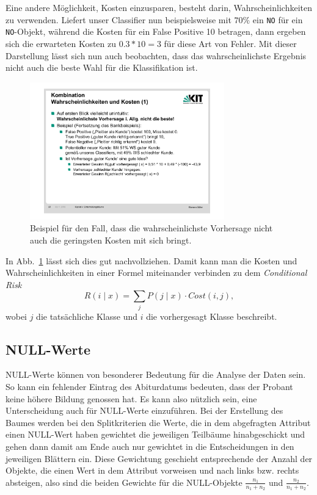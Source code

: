 Eine andere Möglichkeit, Kosten einzusparen, besteht darin, Wahrscheinlichkeiten
zu verwenden. Liefert unser Classifier nun beispielsweise mit \(70\%\) ein
\texttt{NO} für ein \texttt{NO}-Objekt, während die Kosten für ein False Positive 10 betragen,
dann ergeben sich die erwarteten Kosten zu \(0.3 * 10 = 3\) für diese Art von
Fehler. Mit dieser Darstellung
lässt sich nun auch beobachten, dass das wahrscheinlichste Ergebnis nicht auch
die beste Wahl für die Klassifikation ist.

\begin{figure}[ht]
	\centering
	\includegraphics[width=0.75\textwidth]{Figures/classifier}
	\caption[Beispiel Classifier]{Beispiel für  den Fall, dass
	die wahrscheinlichste Vorhersage nicht auch die geringsten Kosten
	mit sich bringt.\footnotemark}
	\label{fig:classifier_ex}
\end{figure}

In Abb.~\ref{fig:classifier_ex} lässt sich dies gut nachvollziehen. Damit kann
man die Kosten und Wahrscheinlichkeiten in einer Formel miteinander verbinden
zu dem \textit{Conditional Risk}
\[
	R(i \mid x) = \sum_j P(j \mid x) \cdot Cost(i,j),
\]
wobei \(j\) die tatsächliche Klasse und \(i\) die vorhergesagt Klasse beschreibt.


\subsection{NULL-Werte}
NULL-Werte können von besonderer Bedeutung für die Analyse der Daten sein. So
kann ein fehlender Eintrag des Abiturdatums bedeuten, dass der Probant keine
höhere Bildung genossen hat. Es kann also nützlich sein, eine Unterscheidung auch
für NULL-Werte einzuführen. Bei der Erstellung des Baumes werden bei den
Splitkriterien die Werte, die in dem abgefragten Attribut einen NULL-Wert haben
gewichtet die jeweiligen Teilbäume hinabgeschickt und gehen dann damit am Ende auch
nur gewichtet in die Entscheidungen in den jeweiligen Blättern ein. Diese Gewichtung
geschieht entsprechende der Anzahl der Objekte, die einen Wert in dem Attribut vorweisen
und nach links bzw. rechts absteigen, also sind die beiden Gewichte für die 
NULL-Objekte \(\frac{n_1}{n_1 + n_2}\) und \(\frac{n_2}{n_1 + n_2}\).
